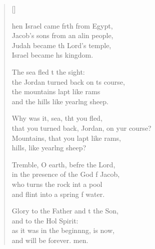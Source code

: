 \settowidth{\versewidth}{that you turned back, Jordan, on your course?}
\begin{verse}[\versewidth]
  \begin{patverse}
hen Israel came frth from Egypt,\Med\\
Jacob’s sons from an alin people,\\
Judah became th Lord’s temple,\Med\\
Israel became h\pointup{\i}s kingdom.

The sea fled t the sight:\Med\\
the Jordan turned back on \pointup{\i}ts course,\\
the mountains lapt like rams\Med\\
and the hills like yearl\pointup{\i}ng sheep.

Why was it, sea, tht you fled,\Med\\
that you turned back, Jordan, on yur course?\\
Mountains, that you lapt like rams,\Med\\
hills, like yearl\pointup{\i}ng sheep?

Tremble, O earth, befre the Lord,\Med\\
in the presence of the God f Jacob,\\
who turns the rock int a pool\Med\\
and flint into a spring f water.

Glory to the Father and t the Son,\Med\\
and to the Hol Spirit:\\
as it was in the beginn\pointup{\i}ng, is now,\Med\\
and will be forever. men.
  \end{patverse}
\end{verse}
